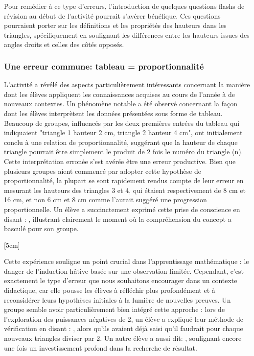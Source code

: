 Pour remédier à ce type d'erreurs,
l'introduction de quelques questions flashs de révision au début de l'activité pourrait s'avérer bénéfique.
Ces questions pourraient porter sur les définitions et les propriétés des hauteurs dans les triangles,
spécifiquement en soulignant les différences entre les hauteurs issues des angles droits et celles des côtés opposés.

\subsubsection{Une erreur commune: tableau = proportionnalité}

L'activité a révélé des aspects particulièrement intéressants concernant la manière dont les élèves appliquent les connaissances acquises au cours de l'année à de nouveaux contextes.
Un phénomène notable a été observé concernant la façon dont les élèves interprètent les données présentées sous forme de tableau.
Beaucoup de groupes,
influencés par les deux premières entrées du tableau qui indiquaient "triangle 1 hauteur 2 cm, triangle 2 hauteur 4 cm",
ont initialement conclu à une relation de proportionnalité,
suggérant que la hauteur de chaque triangle pourrait être simplement le produit de 2 fois le numéro du triangle (n).\\

Cette interprétation erronée s'est avérée être une erreur productive.
Bien que plusieurs groupes aient commencé par adopter cette hypothèse de proportionnalité,
la plupart se sont rapidement rendus compte de leur erreur en mesurant les hauteurs des triangles 3 et 4,
qui étaient respectivement de 8 cm et 16 cm,
et non 6 cm et 8 cm comme l'aurait suggéré une progression proportionnelle.
Un élève a succinctement exprimé cette prise de conscience en disant :
,
illustrant clairement le moment où la compréhension du concept a basculé pour son groupe.

[5cm]

Cette expérience souligne un point crucial dans l'apprentissage mathématique :
le danger de l'induction hâtive basée sur une observation limitée.
Cependant,
c'est exactement le type d'erreur que nous souhaitons encourager dans un contexte didactique,
car elle pousse les élèves à réfléchir plus profondément et à reconsidérer leurs hypothèses initiales à la lumière de nouvelles preuves.
Un groupe semble avoir particulièrement bien intégré cette approche :
lors de l'exploration des puissances négatives de 2,
un élève a expliqué leur méthode de vérification en disant :
,
alors qu'ils avaient déjà saisi qu'il faudrait pour chaque nouveaux triangles diviser par 2.
Un autre élève a aussi dit: ,
soulignant encore une fois un investissement profond dans la recherche de résultat.

